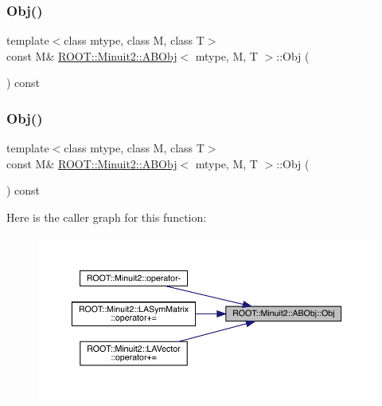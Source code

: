 \mbox{\label{classROOT_1_1Minuit2_1_1ABObj_a82bf2a4359c24b894e4e8990185432c1}} 
\subsubsection{\texorpdfstring{Obj()}{Obj()}\hspace{0.1cm}{\footnotesize\ttfamily [1/2]}}
{\footnotesize\ttfamily template$<$class mtype, class M, class T$>$ \\
const M\& \mbox{\hyperlink{classROOT_1_1Minuit2_1_1ABObj}{R\+O\+O\+T\+::\+Minuit2\+::\+A\+B\+Obj}}$<$ mtype, M, T $>$\+::Obj (\begin{DoxyParamCaption}{ }\end{DoxyParamCaption}) const\hspace{0.3cm}{\ttfamily [inline]}}

\mbox{\label{classROOT_1_1Minuit2_1_1ABObj_a82bf2a4359c24b894e4e8990185432c1}} 
\subsubsection{\texorpdfstring{Obj()}{Obj()}\hspace{0.1cm}{\footnotesize\ttfamily [2/2]}}
{\footnotesize\ttfamily template$<$class mtype, class M, class T$>$ \\
const M\& \mbox{\hyperlink{classROOT_1_1Minuit2_1_1ABObj}{R\+O\+O\+T\+::\+Minuit2\+::\+A\+B\+Obj}}$<$ mtype, M, T $>$\+::Obj (\begin{DoxyParamCaption}{ }\end{DoxyParamCaption}) const\hspace{0.3cm}{\ttfamily [inline]}}

Here is the caller graph for this function\+:\nopagebreak
\begin{figure}[H]
\begin{center}
\leavevmode
\includegraphics[width=350pt]{d8/d4e/classROOT_1_1Minuit2_1_1ABObj_a82bf2a4359c24b894e4e8990185432c1_icgraph}
\end{center}
\end{figure}



